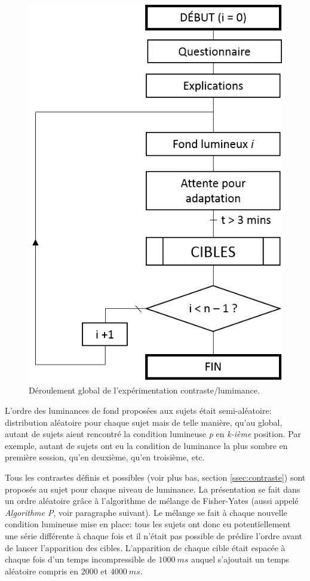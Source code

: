 	\begin{figure}
		\centering
		\includegraphics[scale=0.8]{Figures/FlowchartExpeRVPGeneral}
		\caption{Déroulement global de l'expérimentation contraste/lumimance.}
		\label{fig:flowchart_expe_general}
	\end{figure}
	
	\par L'ordre des luminances de fond proposées aux sujets était semi-aléatoire: distribution aléatoire pour chaque sujet mais de telle manière, qu'au global, autant de sujets aient rencontré la condition lumineuse \textit{p} en \textit{k-ième} position. Par exemple, autant de sujets ont eu la condition de luminance la plus sombre en première session, qu'en deuxième, qu'en troisième, etc.
	
	\par Tous les contrastes définis et possibles (voir plus bas, section \ref{ssec:contraste}) sont proposés au sujet pour chaque niveau de luminance. La présentation se fait dans un ordre aléatoire grâce à l'algorithme de mélange de Fisher-Yates (aussi appelé \textit{Algorithme P}, voir paragraphe suivant). Le mélange se fait à chaque nouvelle condition lumineuse mise en place: tous les sujets ont donc eu potentiellement une série différente à chaque fois et il n'était pas possible de prédire l'ordre avant de lancer l'apparition des cibles. L'apparition de chaque cible était espacée à chaque fois d'un temps incompressible de $1000~ms$ auquel s'ajoutait un temps aléatoire compris en $2000$ et $4000~ms$.
	

